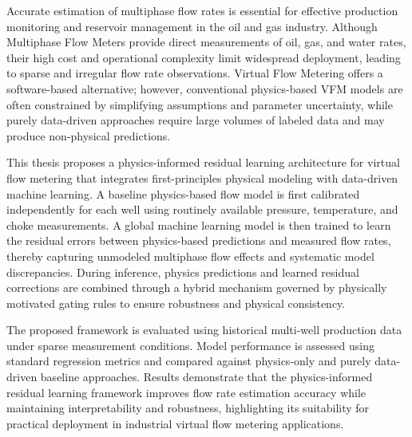 \documentclass[12pt,APA]{uomthesis}
\begin{document}
\begin{abstractpage}
Accurate estimation of multiphase flow rates is essential for effective production monitoring and reservoir management in the oil and gas industry. Although Multiphase Flow Meters provide direct measurements of oil, gas, and water rates, their high cost and operational complexity limit widespread deployment, leading to sparse and irregular flow rate observations. Virtual Flow Metering offers a software-based alternative; however, conventional physics-based VFM models are often constrained by simplifying assumptions and parameter uncertainty, while purely data-driven approaches require large volumes of labeled data and may produce non-physical predictions.

This thesis proposes a physics-informed residual learning architecture for virtual flow metering that integrates first-principles physical modeling with data-driven machine learning. A baseline physics-based flow model is first calibrated independently for each well using routinely available pressure, temperature, and choke measurements. A global machine learning model is then trained to learn the residual errors between physics-based predictions and measured flow rates, thereby capturing unmodeled multiphase flow effects and systematic model discrepancies. During inference, physics predictions and learned residual corrections are combined through a hybrid mechanism governed by physically motivated gating rules to ensure robustness and physical consistency.

The proposed framework is evaluated using historical multi-well production data under sparse measurement conditions. Model performance is assessed using standard regression metrics and compared against physics-only and purely data-driven baseline approaches. Results demonstrate that the physics-informed residual learning framework improves flow rate estimation accuracy while maintaining interpretability and robustness, highlighting its suitability for practical deployment in industrial virtual flow metering applications.
\end{abstractpage}


\begin{ToC}
\makeatletter
 \makeatother
\end{ToC}

\iffigures
    \begin{LoF}
        \makeatletter
        \makeatother
    \end{LoF}
\fi
\end{document}
